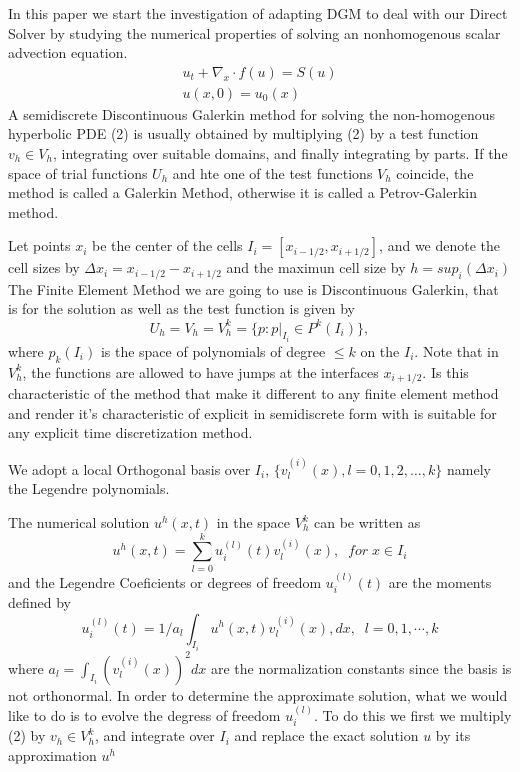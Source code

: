 \documentclass[a4paper,10pt]{article}
\begin{document}
In this paper we start the investigation of adapting DGM to deal with our Direct Solver by studying the numerical properties of solving an nonhomogenous scalar advection equation.  
\begin{eqnarray}
 u_t + \nabla_x \cdot f(u) = S(u) \\
 u(x,0) = u_0(x) \nonumber
\end{eqnarray}
A semidiscrete Discontinuous Galerkin method for solving the non-homogenous hyperbolic PDE (2) is usually obtained by multiplying (2) by a test function $v_h \in V_h$, integrating over suitable domains, and finally integrating by parts. If the space of trial functions $U_h$ and hte one of the test functions $V_h$ coincide, the method is called a Galerkin Method, otherwise it is called a Petrov-Galerkin method.

Let points $x_i$ be the center of the cells $I_i = [x_{i-1/2},x_{i+1/2}]$, and we denote the cell sizes by $\Delta x_i = x_{i-1/2}-x_{i+1/2}$ and the maximun cell size by $h =  sup_i(\Delta x_i)$ The Finite Element Method we are going to use is Discontinuous Galerkin, that is for the solution as well as the test function is given by
\begin{equation}
 U_h = V_h = V_h^k = \{p : p|_{I_i} \in P^k(I_i)\},
\end{equation}
where $p_k(I_i)$ is the space of polynomials of degree $\leq k$ on the $I_i$. Note that in $V_h^k$, the functions are allowed to have jumps at the interfaces $x_{i+1/2}$. Is this characteristic of the method that make it different to any finite element method and render it's characteristic of explicit in semidiscrete form with is suitable for any explicit time discretization method.

We adopt a local Orthogonal basis over $I_i$, $\{v_l^{(i)}(x), l=0,1,2, \dots, k\}$ namely the Legendre polynomials.

The numerical solution $u^h(x,t)$ in the space $V_h^k$ can be written as
\begin{equation}
 u^h(x,t) = \sum_{l=0}^{k} u_i^{(l)}(t)v_l^({i})(x), \; \; for \; x \in I_i
\end{equation}
and the Legendre Coeficients or degrees of freedom $u_i^{(l)}(t)$ are the moments defined by
\begin{equation}
 u_i^{(l)}(t) = 1/a_l \int_{I_i} u^h(x,t)v_l^{(i)}(x),dx, \; \; l = 0,1, \cdots,k
\end{equation}
where $a_l = \int_{I_i} (v_l^{(i)}(x))^2 dx$ are the normalization constants since the basis is not orthonormal. In order to determine the approximate solution, what we would like to do is to evolve the degress of freedom $u_i^{(l)}$. To do this we first we multiply (2) by $v_h \in V_h^k$, and integrate over $I_i$ and replace the exact solution $u$ by its approximation $u^h$
\end{document}
